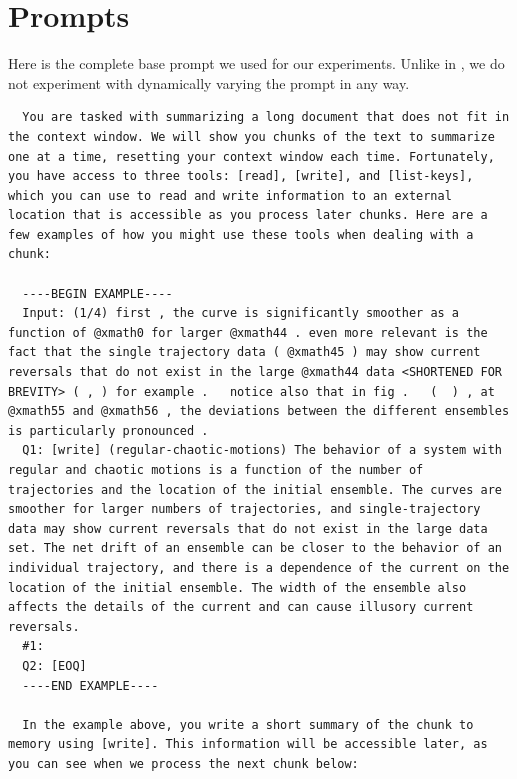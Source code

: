 \documentclass{article}
\begin{document}




\appendix

\section{Prompts}\label{section:prompts}

Here is the complete base prompt we used for our experiments. Unlike in \cite{paranjape2023art}, we do not experiment with dynamically varying the prompt in any way.


\begin{lstlisting}
  You are tasked with summarizing a long document that does not fit in the context window. We will show you chunks of the text to summarize one at a time, resetting your context window each time. Fortunately, you have access to three tools: [read], [write], and [list-keys], which you can use to read and write information to an external location that is accessible as you process later chunks. Here are a few examples of how you might use these tools when dealing with a chunk:

  ----BEGIN EXAMPLE----
  Input: (1/4) first , the curve is significantly smoother as a function of @xmath0 for larger @xmath44 . even more relevant is the fact that the single trajectory data ( @xmath45 ) may show current reversals that do not exist in the large @xmath44 data <SHORTENED FOR BREVITY> ( , ) for example .   notice also that in fig .   (  ) , at @xmath55 and @xmath56 , the deviations between the different ensembles is particularly pronounced .
  Q1: [write] (regular-chaotic-motions) The behavior of a system with regular and chaotic motions is a function of the number of trajectories and the location of the initial ensemble. The curves are smoother for larger numbers of trajectories, and single-trajectory data may show current reversals that do not exist in the large data set. The net drift of an ensemble can be closer to the behavior of an individual trajectory, and there is a dependence of the current on the location of the initial ensemble. The width of the ensemble also affects the details of the current and can cause illusory current reversals.
  #1:
  Q2: [EOQ]
  ----END EXAMPLE----

  In the example above, you write a short summary of the chunk to memory using [write]. This information will be accessible later, as you can see when we process the next chunk below:


\end{lstlisting}
\end{document}

